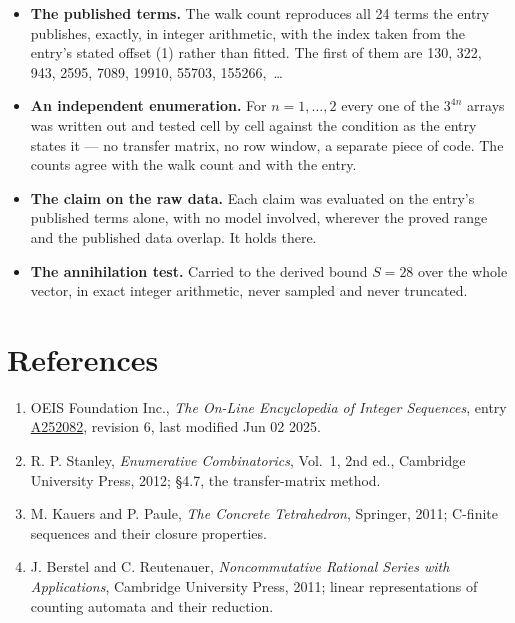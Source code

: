 \documentclass[11pt]{article}
\theoremstyle{definition}
\begin{document}
\begin{itemize}

\item {\bfseries The published terms.} The walk count reproduces all 24 terms the entry publishes, exactly, in integer arithmetic, with the index taken from the entry's stated offset (1) rather than fitted. The first of them are 130, 322, 943, 2595, 7089, 19910, 55703, 155266,~\dots

\item {\bfseries An independent enumeration.} For $n = 1,\dots,2$ every one of the $3^{4n}$ arrays was written out and tested cell by cell against the condition as the entry states it --- no transfer matrix, no row window, a separate piece of code. The counts agree with the walk count and with the entry.

\item {\bfseries The claim on the raw data.} Each claim was evaluated on the entry's published terms alone, with no model involved, wherever the proved range and the published data overlap. It holds there.

\item {\bfseries The annihilation test.} Carried to the derived bound $S = 28$ over the whole vector, in exact integer arithmetic, never sampled and never truncated.

\end{itemize}

\section{References}

\begin{enumerate}

\item OEIS Foundation Inc., \emph{The On-Line Encyclopedia of Integer Sequences}, entry \href{https://oeis.org/A252082}{A252082}, revision 6, last modified Jun 02 2025.

\item R. P. Stanley, \emph{Enumerative Combinatorics}, Vol.~1, 2nd ed., Cambridge University Press, 2012; \S4.7, the transfer-matrix method.

\item M. Kauers and P. Paule, \emph{The Concrete Tetrahedron}, Springer, 2011; C-finite sequences and their closure properties.

\item J. Berstel and C. Reutenauer, \emph{Noncommutative Rational Series with Applications}, Cambridge University Press, 2011; linear representations of counting automata and their reduction.

\end{enumerate}
\end{document}
